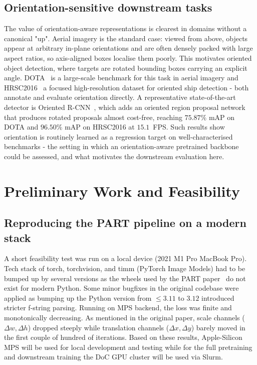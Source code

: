 \documentclass[11pt,a4paper]{report}
\begin{document}
\section{Orientation-sensitive downstream tasks}
The value of orientation-aware representations is clearest in domains without a canonical "up". Aerial imagery is the standard case: viewed from above, objects appear at arbitrary in-plane orientations and are often densely packed with large aspect ratios, so axis-aligned boxes localise them poorly. This motivates oriented object detection, where targets are rotated bounding boxes carrying an explicit angle. DOTA~\cite{dota} is a large-scale benchmark for this task in aerial imagery and HRSC2016~\cite{hrsc2016} a focused high-resolution dataset for oriented ship detection - both annotate and evaluate orientation directly. A representative state-of-the-art detector is Oriented R-CNN~\cite{orcnn}, which adds an oriented region proposal network that produces rotated proposals almost cost-free, reaching $75.87\%$ mAP on DOTA and $96.50\%$ mAP on HRSC2016 at $15.1$~FPS. Such results show orientation is routinely learned as a regression target on well-characterised benchmarks - the setting in which an orientation-aware pretrained backbone could be assessed, and what motivates the downstream evaluation here.

\chapter{Preliminary Work and Feasibility}

\section{Reproducing the PART pipeline on a modern stack}
A short feasibility test was run on a local device (2021 M1 Pro MacBook Pro). Tech stack of torch, torchvision, and timm (PyTorch Image Models) had to be bumped up by several versions as the wheels used by the PART paper~\cite{part} do not exist for modern Python. Some minor bugfixes in the original codebase were applied as bumping up the Python version from $\leq 3.11$ to $3.12$ introduced stricter f-string parsing. Running on MPS backend, the loss was finite and monotonically decreasing. As mentioned in the original paper, scale channels ($\Delta w, \Delta h$) dropped steeply while translation channels ($\Delta x, \Delta y$) barely moved in the first couple of hundred of iterations. Based on these results, Apple-Silicon MPS will be used for local development and testing while for the full pretraining and downstream training the DoC GPU cluster will be used via Slurm.
\end{document}
